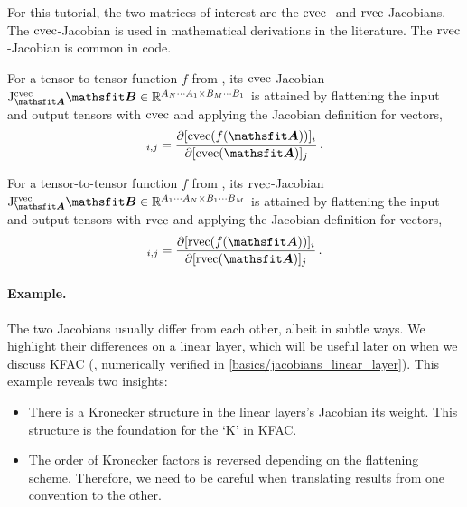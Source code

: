 \switchcolumn[1]
\switchcolumn[0]

For this tutorial, the two matrices of interest are the $\operatorname{cvec}$- and $\operatorname{rvec}$-Jacobians.
The $\operatorname{cvec}$-Jacobian is used in mathematical derivations in the literature.
The $\operatorname{rvec}$-Jacobian is common in code.

\begin{definition}\label{def:cvec_jacobian}
  For a tensor-to-tensor function $f$ from , its $\operatorname{cvec}$-Jacobian $\jac^{\cvec}_{\tA}\tB \in \sR^{A_N \cdots A_1 \times B_M \cdots B_1}$ is attained by flattening the input and output tensors with $\operatorname{cvec}$ and applying the Jacobian definition for vectors,
  \begin{align*}
    [\jac^{\cvec}_{\tA}\tB]_{i,j}
    =
    \frac{\partial [\cvec(f(\tA))]_i}{\partial [\cvec(\tA)]_j}\,.
  \end{align*}
\end{definition}

\begin{definition}\label{def:rvec_jacobian}
  For a tensor-to-tensor function $f$ from , its $\operatorname{rvec}$-Jacobian $\jac^{\rvec}_{\tA}\tB \in \sR^{A_1 \cdots A_N \times B_1 \cdots B_M}$ is attained by flattening the input and output tensors with $\operatorname{rvec}$ and applying the Jacobian definition for vectors,
  \begin{align*}
    [\jac^{\rvec}_{\tA}\tB]_{i,j}
    =
    \frac{\partial [\rvec(f(\tA))]_i}{\partial [\rvec(\tA)]_j}\,.
  \end{align*}
\end{definition}

\paragraph{Example.} The two Jacobians usually differ from each other, albeit in subtle ways.
We highlight their differences on a linear layer, which will be useful later on when we discuss KFAC (, numerically verified in \cref{basics/jacobians_linear_layer}).
This example reveals two insights:
\begin{itemize}
\item There is a Kronecker structure in the linear layers's Jacobian \wrt its weight.
  This structure is the foundation for the `K' in KFAC.

\item The order of Kronecker factors is reversed depending on the flattening scheme.
  Therefore, we need to be careful when translating results from one convention to the other.
\end{itemize}

